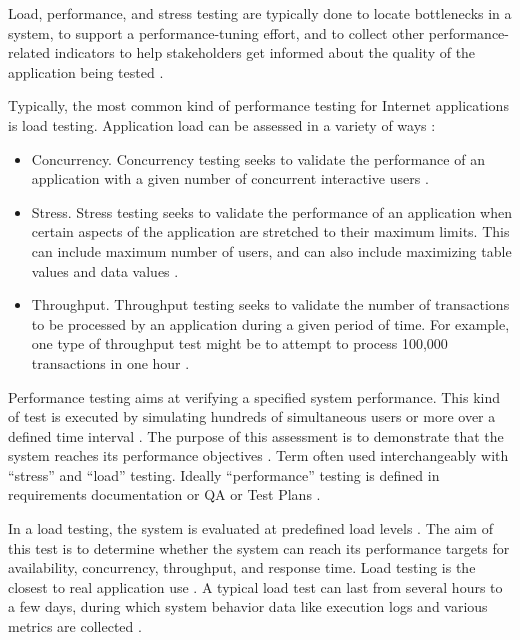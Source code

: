 \documentclass[espaco=umemeio,chapter=TITLE,twoside,openright]{abnt}
\begin{document}
Load, performance, and stress testing are typically done to locate bottlenecks in a system, to support a performance-tuning effort, and to collect other performance-related indicators to help stakeholders get informed about the quality of the application being tested \cite{Sandler2004} \cite{Corporation2007}.

Typically, the most common kind of performance testing for Internet applications is load testing. Application load can be assessed in a variety of ways \cite{Perry2004}:

\begin{itemize}
\item Concurrency. Concurrency testing seeks to validate the performance of an application with a given number of concurrent interactive users \cite{Perry2004}.
\item Stress. Stress testing seeks to validate the performance of an application when certain aspects of the application are stretched to their maximum limits. This can include maximum number of users, and can also include maximizing table values and data values \cite{Perry2004}.
\item Throughput. Throughput testing seeks to validate the number of transactions to be processed by an application during a given period of time. For example, one type of throughput test might be to attempt to process 100,000 transactions in one hour \cite{Perry2004}.
\end{itemize}


Performance testing aims at verifying a specified system performance. This kind of test is executed by simulating hundreds of simultaneous users or more over a defined time interval \cite{DiLucca2006}. The purpose of this assessment is to demonstrate that the system reaches its performance objectives \cite{Sandler2004}.  Term often used interchangeably with “stress” and “load” testing. Ideally “performance” testing is defined in requirements documentation or QA or Test Plans \cite{Lewis2005}.


In a load testing, the system is evaluated at predefined load levels \cite{DiLucca2006}. The aim of this test is to determine whether the system can reach its performance targets for availability, concurrency, throughput, and response time. Load testing is the closest to real application use \cite{Molyneaux2009}. A typical load test can last from several hours to a few days, during which system behavior data like execution logs and various metrics are collected \cite{Afzal2009a}.
\end{document}
